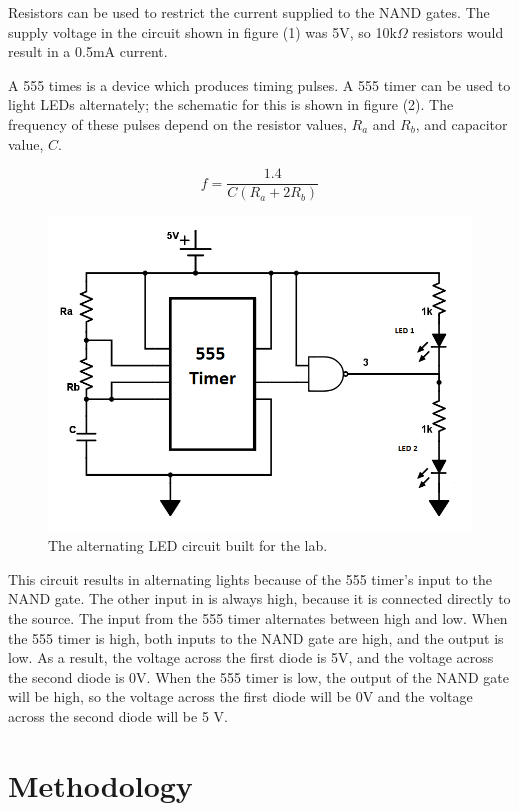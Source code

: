 \documentclass[twocolumn, amsmath]{revtex4}
\begin{document}
Resistors can be used to restrict the current supplied to the NAND gates. The supply voltage in the circuit shown in figure (1) was 5V, so 10k$\Omega$ resistors would result in a 0.5mA current.

A 555 times is a device which produces timing pulses. A 555 timer can be used to light LEDs alternately; the schematic for this is shown in figure (2). The frequency of these pulses depend on the resistor values, $R_a$ and $R_b$, and capacitor value, $C$.

\begin{equation}
f = \frac{1.4}{C(R_a + 2R_b)}
\end{equation}

\begin{figure}[h]
    \includegraphics[scale=0.35]{555.png}  
    \caption{The alternating LED circuit built for the lab.}
\end{figure}

This circuit results in alternating lights because of the 555 timer's input to the NAND gate. The other input in is always high, because it is connected directly to the source. The input from the 555 timer alternates between high and low. When the 555 timer is high, both inputs to the NAND gate are high, and the output is low. As a result, the voltage across the first diode is 5V, and the voltage across the second diode is 0V. When the 555 timer is low, the output of the NAND gate will be high, so the voltage across the first diode will be 0V and the voltage across the second diode will be 5 V.

\section{Methodology}
\end{document}
